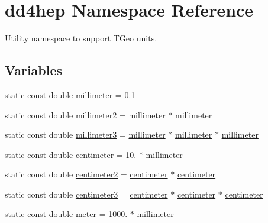\hypertarget{namespacedd4hep}{
\section{dd4hep Namespace Reference}
\label{namespacedd4hep}
}


Utility namespace to support TGeo units.  
\subsection*{Variables}
\begin{DoxyCompactItemize}
\item 
static const double \hyperlink{namespacedd4hep_a1b3044c28560621f033b6f0fb9a15854}{millimeter} = 0.1
\item 
static const double \hyperlink{namespacedd4hep_a1096fbca749064ac09ed44d5a2b37599}{millimeter2} = \hyperlink{namespacedd4hep_a1b3044c28560621f033b6f0fb9a15854}{millimeter} $\ast$ \hyperlink{namespacedd4hep_a1b3044c28560621f033b6f0fb9a15854}{millimeter}
\item 
static const double \hyperlink{namespacedd4hep_a2ea09df717c3b153b6ea78fbd517fddc}{millimeter3} = \hyperlink{namespacedd4hep_a1b3044c28560621f033b6f0fb9a15854}{millimeter} $\ast$ \hyperlink{namespacedd4hep_a1b3044c28560621f033b6f0fb9a15854}{millimeter} $\ast$ \hyperlink{namespacedd4hep_a1b3044c28560621f033b6f0fb9a15854}{millimeter}
\item 
static const double \hyperlink{namespacedd4hep_af17522b334712876a204971dee26c063}{centimeter} = 10. $\ast$ \hyperlink{namespacedd4hep_a1b3044c28560621f033b6f0fb9a15854}{millimeter}
\item 
static const double \hyperlink{namespacedd4hep_a43a537cf81dbb2fb1476264a37bb3945}{centimeter2} = \hyperlink{namespacedd4hep_af17522b334712876a204971dee26c063}{centimeter} $\ast$ \hyperlink{namespacedd4hep_af17522b334712876a204971dee26c063}{centimeter}
\item 
static const double \hyperlink{namespacedd4hep_a5d565a155d7d3b225e52dc0b97c8186d}{centimeter3} = \hyperlink{namespacedd4hep_af17522b334712876a204971dee26c063}{centimeter} $\ast$ \hyperlink{namespacedd4hep_af17522b334712876a204971dee26c063}{centimeter} $\ast$ \hyperlink{namespacedd4hep_af17522b334712876a204971dee26c063}{centimeter}
\item 
static const double \hyperlink{namespacedd4hep_a46f5cf0231796af4296a307a58812b06}{meter} = 1000. $\ast$ \hyperlink{namespacedd4hep_a1b3044c28560621f033b6f0fb9a15854}{millimeter}
\item 

\end{DoxyCompactItemize}
